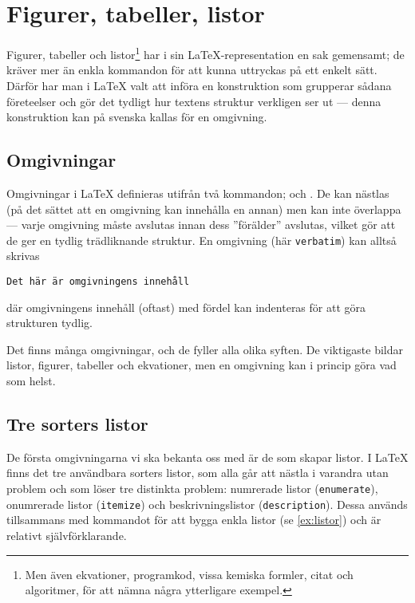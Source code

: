 \documentclass[10pt,../../a4.tex]{subfiles}
\begin{document}
\section{Figurer, tabeller, listor}
Figurer, tabeller och listor\footnote{Men även ekvationer, programkod,
vissa kemiska formler, citat och algoritmer, för att nämna några
ytterligare exempel.} har i sin \LaTeX-representation en sak gemensamt;
de kräver mer än enkla kommandon för att kunna uttryckas på ett enkelt
sätt. Därför har man i \LaTeX{} valt att införa en konstruktion som
grupperar sådana företeelser och gör det tydligt hur textens struktur
verkligen ser ut — denna konstruktion kan på svenska kallas för en 
omgivning.

\subsection{Omgivningar }\label{sec:omg}
Omgivningar i \LaTeX{} definieras utifrån två kommandon;  och
. De kan nästlas (på det sättet att en omgivning kan innehålla
en annan) men kan inte överlappa — varje omgivning måste avslutas innan
dess ”förälder” avslutas, vilket gör att de ger en tydlig trädliknande
struktur. En omgivning (här \texttt{verbatim}) kan alltså skrivas
\begin{latexcode}
\begin{verbatim}
Det här är omgivningens innehåll
\end{verbatim}
\end{latexcode}
där omgivningens innehåll (oftast) med fördel kan indenteras för att göra
strukturen tydlig.

Det finns många omgivningar, och de fyller alla olika syften. De
viktigaste bildar listor, figurer, tabeller och ekvationer, men en
omgivning kan i princip göra vad som helst.

\subsection{Tre sorters listor}
De första omgivningarna vi ska bekanta oss med är de som skapar listor.
I \LaTeX{} finns det tre användbara sorters listor, som alla går att
nästla i varandra utan problem och som löser tre distinkta problem:
numrerade listor (\texttt{enumerate}), onumrerade listor 
(\texttt{itemize}) och beskrivningslistor (\texttt{description}). Dessa
används tillsammans med kommandot  för att bygga enkla listor
(se \cref{ex:listor}) och är relativt självförklarande.
\end{document}
